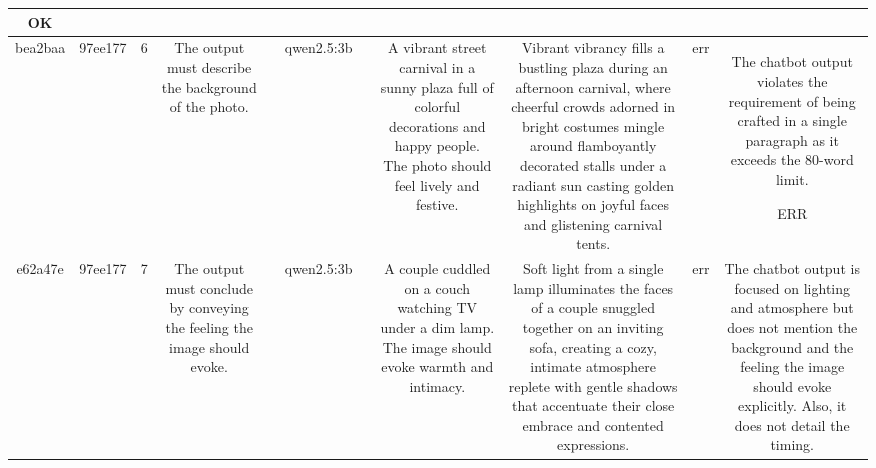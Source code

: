 \begin{table}[h!]
\begin{tabular}{|c|c|c|c|c|c|c|c|c|c|c|}
OK\\
\hline
bea2baa & 97ee177 & 6 & The output must describe the background of the photo. &  & qwen2.5:3b &  & A vibrant street carnival in a sunny plaza full of colorful decorations and happy people. The photo should feel lively and festive. & Vibrant vibrancy fills a bustling plaza during an afternoon carnival, where cheerful crowds adorned in bright costumes mingle around flamboyantly decorated stalls under a radiant sun casting golden highlights on joyful faces and glistening carnival tents. & err & The chatbot output violates the requirement of being crafted in a single paragraph as it exceeds the 80-word limit.

ERR\\
\hline
e62a47e & 97ee177 & 7 & The output must conclude by conveying the feeling the image should evoke. &  & qwen2.5:3b &  & A couple cuddled on a couch watching TV under a dim lamp. The image should evoke warmth and intimacy. & Soft light from a single lamp illuminates the faces of a couple snuggled together on an inviting sofa, creating a cozy, intimate atmosphere replete with gentle shadows that accentuate their close embrace and contented expressions. & err & The chatbot output is focused on lighting and atmosphere but does not mention the background and the feeling the image should evoke explicitly. Also, it does not detail the timing. 


\end{tabular}
\end{table}
